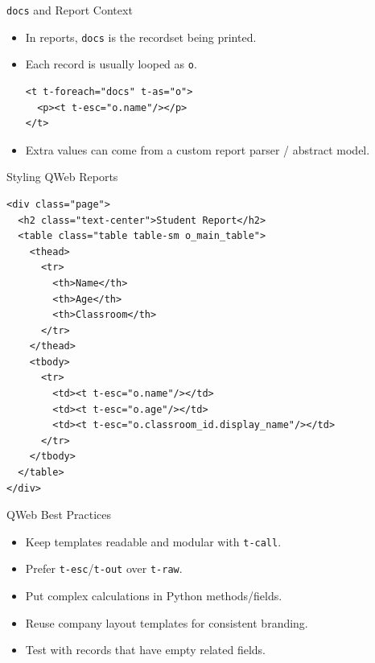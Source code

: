 \begin{frame}[fragile]{\texttt{docs} and Report Context}
	\begin{itemize}
		\item In reports, \texttt{docs} is the recordset being printed.
		\item Each record is usually looped as \texttt{o}.
\begin{lstlisting}[style=xml]
<t t-foreach="docs" t-as="o">
  <p><t t-esc="o.name"/></p>
</t>
\end{lstlisting}
		\item Extra values can come from a custom report parser / abstract model.
	\end{itemize}
\end{frame}

\begin{frame}[fragile]{Styling QWeb Reports}
\begin{lstlisting}[style=xml]
<div class="page">
  <h2 class="text-center">Student Report</h2>
  <table class="table table-sm o_main_table">
	<thead>
	  <tr>
		<th>Name</th>
		<th>Age</th>
		<th>Classroom</th>
	  </tr>
	</thead>
	<tbody>
	  <tr>
		<td><t t-esc="o.name"/></td>
		<td><t t-esc="o.age"/></td>
		<td><t t-esc="o.classroom_id.display_name"/></td>
	  </tr>
	</tbody>
  </table>
</div>
\end{lstlisting}
\end{frame}

\begin{frame}{QWeb Best Practices}
	\begin{itemize}
		\item Keep templates readable and modular with \texttt{t-call}.
		\item Prefer \texttt{t-esc}/\texttt{t-out} over \texttt{t-raw}.
		\item Put complex calculations in Python methods/fields.
		\item Reuse company layout templates for consistent branding.
		\item Test with records that have empty related fields.
	\end{itemize}
\end{frame}
